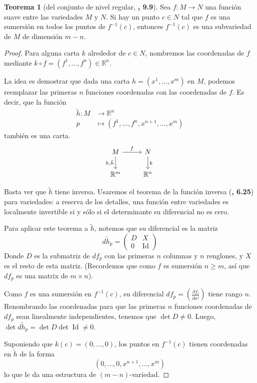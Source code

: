 \documentclass[spanish]{book}
\theoremstyle{definition}
\newtheorem*{teo}{Teorema}
\newcommand{\R}{\mathbb{R}}
\DeclareMathOperator{\Id}{Id}
\begin{document}
\begin{teo}[del conjunto de nivel regular, \cite{Loring}\textbf{, 9.9}]
	Sea $f:M\to N$ una función suave entre las variedades $M$ y $N$. Si hay un punto $c\in N$ tal que $f$ es una sumersión en todos los puntos de $f^{-1}(c)$, entonces $f^{-1}(c)$ es una subvariedad de $M$ de dimensión $m-n$.
\end{teo}
\begin{proof}
	Para alguna carta $k$ alrededor de $c\in N$, nombremos las coordenadas de $f$ mediante $k\circ f=(f^1,\ldots,f^n)\in\R^n$.
	
	La idea es demostrar que dada una carta $h=(x^1,\ldots,x^m)$ en $M$, podemos reemplazar las primeras $n$ funciones coordenadas con las coordenadas de $f$. Es decir, que la función
	\begin{align*}
		\tilde{h}:M&\to\R^n\\
		p&\mapsto(f^1,\ldots,f^n,x^{n+1},\ldots,x^{m})
	\end{align*}
	también es una carta.
	\[	\begin{tikzcd}
		M\arrow{r}{f}\arrow[swap]{d}{h,\tilde{h}}&N\arrow{d}{k}\\
		\R^m&\R^n
	\end{tikzcd}\]
	
	
	Basta ver que $\tilde{h}$ tiene inversa. Usaremos el teorema de la función inversa (\cite{Loring}\textbf{, 6.25}) para variedades: a reserva de los detalles, una función entre variedades es localmente invertible si y sólo si el determinante su diferencial no es cero.
	
	Para aplicar este teorema a $\tilde{h}$, notemos que su diferencial es la matriz 
	\[d\tilde{h}_p=\begin{pmatrix}
		D&X\\
		0&\Id
	\end{pmatrix}\]
	Donde $D$ es la submatriz de $df_p$ con las primeras $n$ columnas y $n$ renglones, y $X$ es el resto de esta matriz. (Recordemos que como $f$ es sumersión $n\geq m$, así que $df_p$ es una matrix de $m\times n$).
	
	Como $f$ es una sumersión en $f^{-1}(c)$, su diferencial $df_p=\left(\frac{\partial f_i}{\partial x^j}\right)$ tiene rango $n$. Renombrando las coordenadas para que las primeras $n$ funciones coordenadas de $df_p$ sean linealmente independientes, tenemos que $\det D\neq0$. Luego, $\det d\tilde{h}_p=\det D\det\Id\neq0$.
	
	Suponiendo que $k(c)=(0,\ldots,0)$, los puntos en $f^{-1}(c)$ tienen coordenadas en $\tilde{h}$ de la forma
	\[(0,\ldots,0,x^{n+1},\ldots,x^{m})\]
	lo que le da una estructura de $(m-n)$-variedad.
\end{proof}
\end{document}
